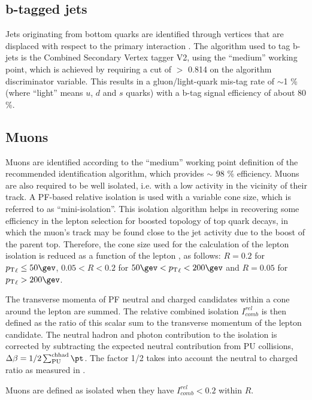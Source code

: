   

\subsection{b-tagged jets}
\label{sec:btags}
Jets originating from bottom quarks are identified through vertices that are displaced with respect to the primary interaction \cite{Chatrchyan:2012jua}. The algorithm used to tag b-jets is the Combined Secondary Vertex tagger V2, using the ``medium'' working point, which is achieved by requiring a cut of $>$ 0.814 on the algorithm discriminator variable. 
This results in a gluon/light-quark mis-tag rate of $\sim$1 \% (where ``light'' means $u$, $d$ and $s$ quarks) with a b-tag signal efficiency of about 80 \%. 



\subsection{Muons}
\label{sec:muon-id}
Muons are identified according to the ``medium'' working point definition of the recommended identification algorithm, which provides $\sim$ 98 $\%$ efficiency. 
Muons are also required to be well isolated, i.e. with a low activity in the vicinity of their track. 
A PF-based relative isolation is used with a variable cone size, which is referred to as ``mini-isolation''.
This isolation algorithm helps in recovering some efficiency in the lepton selection for boosted topology of top quark decays, 
in which the muon's track may be found close to the jet activity due to the boost of the parent top. 
Therefore, the cone size used for the calculation of the lepton isolation is reduced as a function of 
the lepton \Pt, as follows: $R=0.2$ for $\Pt_{\ell}\leq50\gev$, $0.05<R<0.2$ for $50 \gev < \Pt_{\ell} < 200\gev$ and $R=0.05$ for $\Pt_{\ell} > 200 \gev$. 

The transverse momenta of PF neutral and charged candidates within a cone around the lepton are summed. 
The relative combined isolation $I^{rel}_{comb}$ is then defined as 
the ratio of this scalar sum to the transverse momentum of the lepton candidate. 
The neutral hadron and photon contribution to the isolation is corrected 
by subtracting the expected neutral contribution from PU collisions, $\Delta\beta=1/2\sum_{\mathrm{PU}}^{\mathrm{ch had}}{\pt}$. 
The factor 1/2 takes into account the neutral to charged ratio as measured in \cite{CMS-PFT-10-002}. 

Muons are defined as isolated when they have $I^{rel}_{comb} < 0.2$ within $R$.

